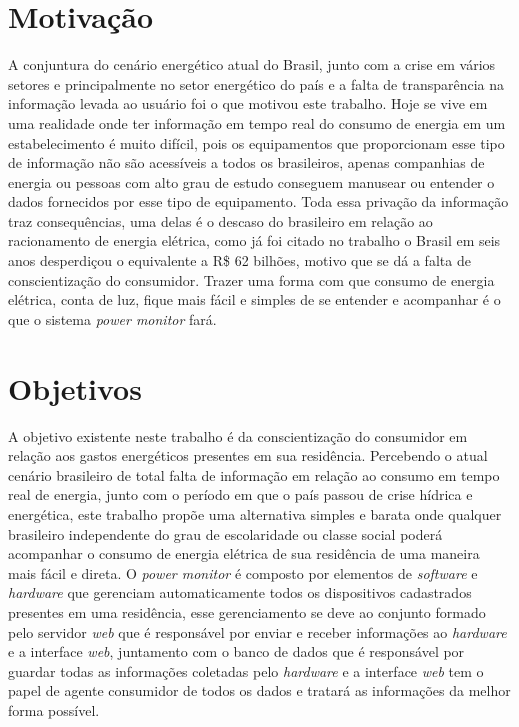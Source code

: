 \section{Motivação}
A conjuntura do cenário energético atual do Brasil, junto com a crise em vários setores e principalmente no setor
energético do país e a falta de transparência na informação levada ao usuário foi o que motivou este trabalho. Hoje se vive em uma realidade onde
ter informação em tempo real do consumo de energia em um estabelecimento é muito difícil, pois os equipamentos que proporcionam esse tipo de informação
não são acessíveis a todos os brasileiros, apenas companhias de energia ou pessoas com alto grau de estudo conseguem manusear ou entender o dados
fornecidos por esse tipo de equipamento. Toda essa privação da informação traz consequências, uma delas é o descaso do brasileiro em relação ao
racionamento de energia elétrica, como já foi citado no trabalho o Brasil em seis anos desperdiçou o equivalente a R\$ 62 bilhões, motivo que se 
dá a falta de conscientização do consumidor. Trazer uma forma com que consumo de energia elétrica, conta de luz, fique mais fácil e simples de se entender
e acompanhar é o que o sistema \textit{power monitor} fará.   

\section{Objetivos}
A objetivo existente neste trabalho é da conscientização do consumidor em relação aos gastos energéticos presentes em sua residência. Percebendo o
atual cenário brasileiro de total falta de informação em relação ao consumo em tempo real de energia, junto com o período em que o país 
passou de crise hídrica e energética, este trabalho propõe uma alternativa simples e barata onde qualquer brasileiro independente do grau de 
escolaridade ou classe social poderá acompanhar o consumo de energia elétrica de sua residência de uma maneira mais fácil e direta. O \textit{power monitor}
é composto por elementos de \textit{software} e \textit{hardware} que gerenciam automaticamente todos os dispositivos cadastrados presentes em uma
residência, esse gerenciamento se deve ao conjunto formado pelo servidor \textit{web} que é responsável por enviar e receber informações ao \textit{hardware} e
a interface \textit{web}, juntamento com o banco de dados que é responsável por guardar todas as informações coletadas pelo \textit{hardware} e a interface
\textit{web} tem o papel de agente consumidor de todos os dados e tratará as informações da melhor forma possível.


